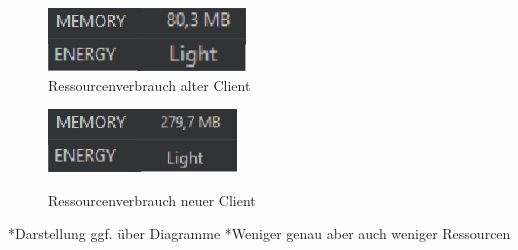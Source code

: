 \begin{figure}[ht]
  \centering
	\begin{minipage}[b]{0.4\textwidth}
     \includegraphics[width=\textwidth]{Bilder/res-app-old} \\
   \caption{Ressourcenverbrauch alter Client}
   \label{fig:res-app-old}
  \end{minipage}
	\hfill
	\begin{minipage}[b]{0.4\textwidth}
     \includegraphics[width=\textwidth]{Bilder/res-app-new} \\
		\caption{Ressourcenverbrauch neuer Client}
		\label{fig:res-app-new}
	\end{minipage}
\end{figure}
\newpage

*Darstellung ggf. über Diagramme\newline
*Weniger genau aber auch weniger Ressourcen\newline
